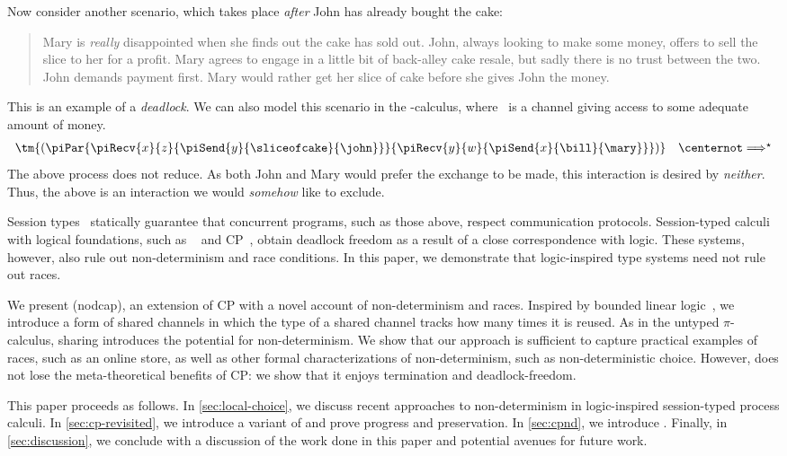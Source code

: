 \documentclass[UKenglish]{llncs}
\begin{document}
Now consider another scenario, which takes place \emph{after} John has already
bought the cake:
\begin{quote}
  Mary is \emph{really} disappointed when she finds out the cake has sold out.
  John, always looking to make some money, offers to sell the slice to her for a
  profit. Mary agrees to engage in a little bit of back-alley cake resale, but
  sadly there is no trust between the two.
  John demands payment first.
  Mary would rather get her slice of cake before she gives John the money.
\end{quote}
This is an example of a \emph{deadlock}. We can also model this scenario in the
\textpi-calculus, where \bill\ is a channel giving access to some adequate
amount of money. 
\[
  \begin{array}{c}
    \tm{(\piPar{%
    \piRecv{x}{z}{\piSend{y}{\sliceofcake}{\john}}
    }{%
    \piRecv{y}{w}{\piSend{x}{\bill}{\mary}}
    })}
    \quad
    \centernot\Longrightarrow^{\star}
  \end{array}  
\]
The above process does not reduce. As both John and Mary would prefer the
exchange to be made, this interaction is desired by \emph{neither}. Thus, the
above is an interaction we would \emph{somehow} like to exclude.

Session types~\parencite{honda1993} statically guarantee that concurrent
programs, such as those above, respect communication protocols.
Session-typed calculi with logical foundations, such as
\piDILL~\parencite{caires2010} and CP~\parencite{wadler2012}, obtain deadlock freedom as a
result of a close correspondence with logic.
These systems, however, also rule out non-determinism and race conditions. In
this paper, we demonstrate that logic-inspired type systems need not rule out
races.

We present \nodcap (nodcap), an extension of CP with a novel account of
non-determinism and races.
Inspired by bounded linear logic~\parencite{girard1992}, we introduce a form of
shared channels in which the type of a shared channel tracks how many times it
is reused.
As in the untyped $\pi$-calculus, sharing introduces the potential for
non-determinism.
We show that our approach is sufficient to capture practical examples of races,
such as an online store, as well as other formal characterizations of
non-determinism, such as non-deterministic choice.  However, \nodcap does not
lose the meta-theoretical benefits of CP: we show that it enjoys termination and
deadlock-freedom.

This paper proceeds as follows.
In \cref{sec:local-choice}, we discuss recent approaches to non-determinism in
logic-inspired session-typed process calculi.
In \cref{sec:cp-revisited}, we introduce a variant of \cp and prove progress and
preservation.
In \cref{sec:cpnd}, we introduce \nodcap.
Finally, in \cref{sec:discussion}, we conclude with a discussion of the work
done in this paper and potential avenues for future work.
\end{document}
